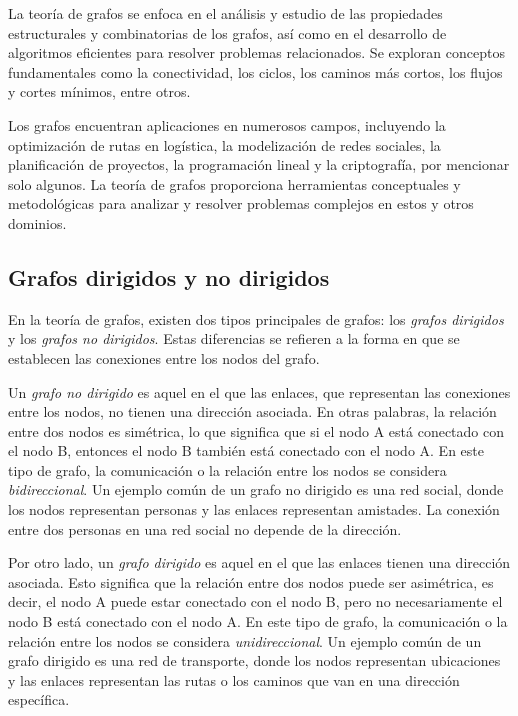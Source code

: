La teoría de grafos se enfoca en el análisis y estudio de las propiedades estructurales y combinatorias
de los grafos, así como en el desarrollo de algoritmos eficientes para resolver problemas relacionados.
Se exploran conceptos fundamentales como la conectividad, los ciclos, los caminos más cortos, los flujos
y cortes mínimos, entre otros.

Los grafos encuentran aplicaciones en numerosos campos, incluyendo la optimización de rutas en
logística, la modelización de redes sociales, la planificación de proyectos, la programación lineal
y la criptografía, por mencionar solo algunos. La teoría de grafos proporciona herramientas conceptuales
y metodológicas para analizar y resolver problemas complejos en estos y otros dominios.

\subsection{Grafos dirigidos y no dirigidos}

En la teoría de grafos, existen dos tipos principales de grafos: los \textit{grafos dirigidos} y
los \textit{grafos no dirigidos}. Estas diferencias se
refieren a la forma en que se establecen las conexiones entre los nodos del grafo.

Un \textit{grafo no dirigido} es aquel en el que las enlaces, que representan las conexiones
entre los nodos, no tienen una dirección asociada. En otras palabras, la relación entre dos
nodos es simétrica, lo que significa que si el nodo A está conectado con el nodo B,
entonces el nodo B también está conectado con el nodo A. En este tipo de grafo, la comunicación
o la relación entre los nodos se considera \textit{bidireccional}. Un ejemplo común de un grafo no
dirigido es una red social, donde los nodos representan personas y las enlaces representan
amistades. La conexión entre dos personas en una red social no depende de la dirección.

Por otro lado, un \textit{grafo dirigido} es aquel en el que las enlaces tienen una dirección
asociada. Esto significa que la relación entre dos nodos puede ser asimétrica, es decir, el
nodo A puede estar conectado con el nodo B, pero no necesariamente el nodo B está conectado
con el nodo A. En este tipo de grafo, la comunicación o la relación entre los nodos se considera
\textit{unidireccional}. Un ejemplo común de un grafo dirigido es una red de transporte, donde los
nodos representan ubicaciones y las enlaces representan las rutas o los caminos que van en una
dirección específica.

